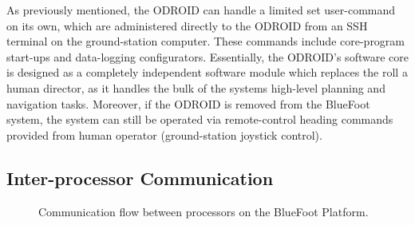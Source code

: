 			As previously mentioned, the ODROID can handle a limited set user-command on its own, which are administered directly to the ODROID from an SSH terminal on the ground-station computer. These commands include core-program start-ups and data-logging configurators. Essentially, the ODROID's software core is designed as a completely independent software module which replaces the roll a human director, as it handles the bulk of the systems high-level planning and navigation tasks. Moreover, if the ODROID is removed from the BlueFoot system, the system can still be operated via remote-control heading commands provided from human operator (\IE ground-station joystick control).
		
		\subsection{Inter-processor Communication}

			\begin{figure}[h!]
				\centering
				\caption{Communication flow between processors on the BlueFoot Platform.}
				\label{fig::comm_flow}
			\end{figure}

